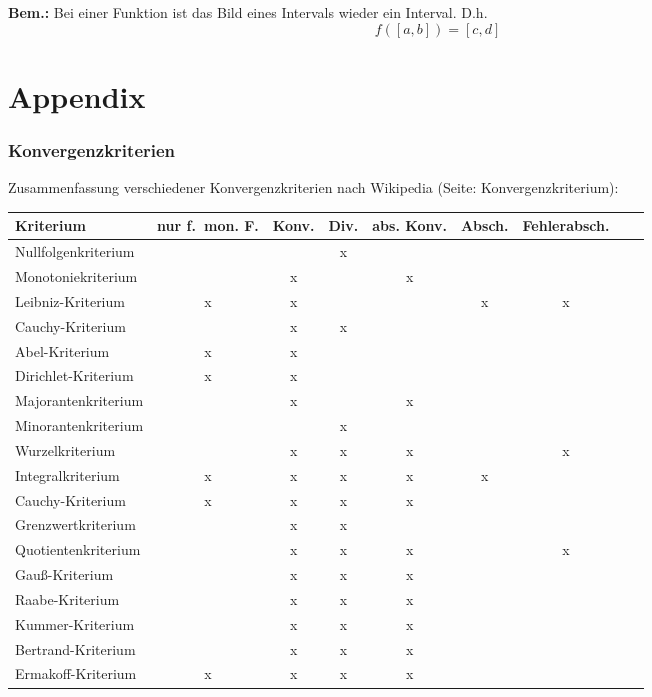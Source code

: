 \documentclass[10pt]{article}
\begin{document}
    \textbf{Bem.:}
    Bei einer Funktion ist das Bild eines Intervals wieder ein Interval. D.h.
    \begin{equation*}
        f([a,b]) = [c, d]
    \end{equation*}

    \pagebreak
    \part{Appendix}
    \section{Konvergenzkriterien}
    Zusammenfassung verschiedener Konvergenzkriterien nach Wikipedia (Seite: Konvergenzkriterium):
    \begin{center}
        \begin{tabular}{lcccccccp{2cm}}
             \toprule
             Kriterium & {nur f.\ mon. F.} & Konv. & Div. & abs. Konv. & Absch. & Fehlerabsch.\\
             \midrule
             Nullfolgenkriterium &  &  & x &  &  & \\
             Monotoniekriterium &  & x &  & x &  & \\
             Leibniz-Kriterium & x & x &  &  & x & x\\
             Cauchy-Kriterium &  & x & x &  &  & \\
             Abel-Kriterium & x & x &  &  &  & \\
             Dirichlet-Kriterium & x & x &  &  &  & \\
             Majorantenkriterium &  & x &  & x &  & \\
             Minorantenkriterium &  &  & x &  &  & \\
             Wurzelkriterium &  & x & x & x &  & x\\
             Integralkriterium & x & x & x & x & x & \\
             Cauchy-Kriterium & x & x & x & x &  & \\
             Grenzwertkriterium &  & x & x &  &  & \\
             Quotientenkriterium &  & x & x & x &  & x\\
             Gauß-Kriterium &  & x & x & x &  & \\
             Raabe-Kriterium &  & x & x & x &  & \\
             Kummer-Kriterium &  & x & x & x &  & \\
             Bertrand-Kriterium &  & x & x & x &  & \\
             Ermakoff-Kriterium & x & x & x & x &  & \\
             \bottomrule
        \end{tabular}
    \end{center}
\end{document}
